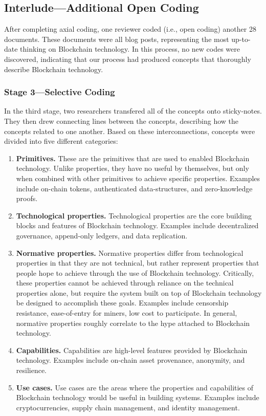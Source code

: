 \subsection{Interlude---Additional Open Coding}
After completing axial coding, one reviewer coded (i.e., open coding) another 28 documents.
These documents were all blog posts, representing the most up-to-date thinking on Blockchain technology.
In this process, no new codes were discovered, indicating that our process had produced concepts that thoroughly describe Blockchain technology.

\subsubsection{Stage 3---Selective Coding}
In the third stage, two researchers transfered all of the concepts onto sticky-notes.
They then drew connecting lines between the concepts, describing how the concepts related to one another.
Based on these interconnections, concepts were divided into five different categories:

\begin{enumerate}
	\item \textbf{Primitives.} These are the primitives that are used to enabled Blockchain technology. Unlike properties, they have no useful by themselves, but only when combined with other primitives to achieve specific properties. Examples include on-chain tokens, authenticated data-structures, and zero-knowledge proofs.
	
	\item \textbf{Technological properties.} Technological properties are the core building blocks and features of Blockchain technology. Examples include decentralized governance, append-only ledgers, and data replication.
	
	\item \textbf{Normative properties.} Normative properties differ from technological properties in that they are not technical, but rather represent properties that people hope to achieve through the use of Blockchain technology. Critically, these properties cannot be achieved through reliance on the technical properties alone, but require the system built on top of Blockchain technology be designed to accomplish these goals. Examples include censorship resistance, ease-of-entry for miners, low cost to participate.
	In general, normative properties roughly correlate to the hype attached to Blockchain technology.

	\item \textbf{Capabilities.} Capabilities are high-level features provided by Blockchain technology. Examples include on-chain asset provenance, anonymity, and resilience.
	
	\item \textbf{Use cases.} Use cases are the areas where the properties and capabilities of Blockchain technology would be useful in building systems. Examples include cryptocurrencies, supply chain management, and identity management.
\end{enumerate}

